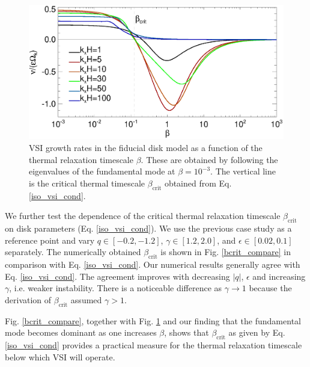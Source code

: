 \begin{figure}
   \includegraphics[width=\linewidth]{figures/gcorr_compare2} 
   \caption{VSI growth rates in the fiducial disk
     model as a function of the thermal relaxation timescale
     $\beta$. These are obtained by following the eigenvalues of the
     fundamental mode at $\beta=10^{-3}$. The vertical line is the
     critical thermal timescale $\beta_\mathrm{crit}$ obtained  
     from Eq. \ref{iso_vsi_cond}. 
     \label{bcrit_compare1}}   
 \end{figure} 
 
 We further test the dependence of the critical thermal relaxation timescale 
 $\beta_\mathrm{crit}$ on disk parameters
 (Eq. \ref{iso_vsi_cond}).  We use the previous case study as a
 reference point and vary $q\in[-0.2,-1.2]$, 
 $\gamma\in[1.2,2.0]$, and $\epsilon\in[0.02,0.1]$
 separately.
 The numerically obtained $\beta_\mathrm{crit}$ is shown in
 Fig. \ref{bcrit_compare} in comparison with Eq. \ref{iso_vsi_cond}.
 Our numerical results generally agree with Eq. \ref{iso_vsi_cond}. The
 agreement improves with decreasing  $|q|$,  $\epsilon$ and increasing
 $\gamma$, i.e. weaker instability. There is a noticeable difference
 as $\gamma\to1$ because the derivation of $\beta_\mathrm{crit}$
 assumed $\gamma>1$.   
 
 Fig. \ref{bcrit_compare}, together with Fig. \ref{bcrit_compare1} and 
 our finding that the fundamental mode becomes dominant as one
 increases $\beta$, shows that $\beta_\mathrm{crit}$ as given 
 by Eq. \ref{iso_vsi_cond} provides a  
 practical measure for the thermal relaxation timescale below which 
 VSI will operate. 



